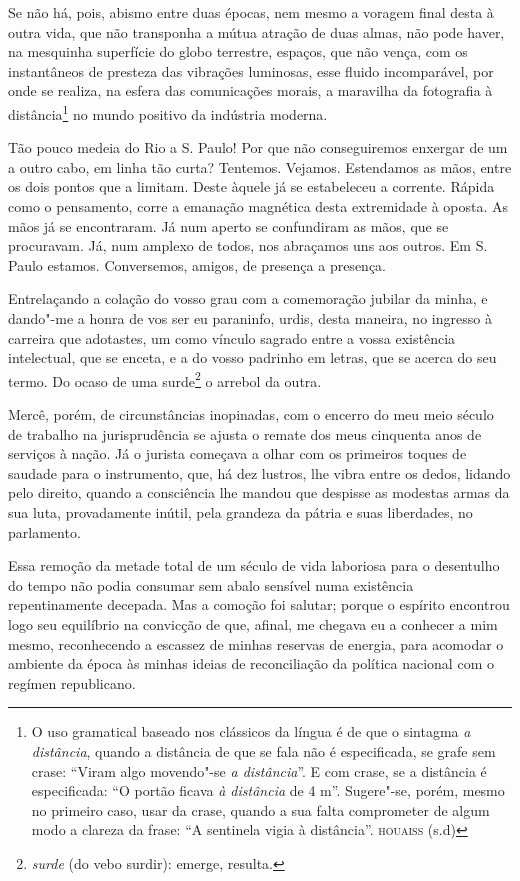 Se não há, pois, abismo entre duas épocas, nem mesmo a voragem
final desta à outra vida, que não transponha a mútua atração de duas
almas, não pode haver, na mesquinha superfície do globo terrestre,
espaços, que não vença, com os instantâneos de presteza das vibrações
luminosas, esse fluido incomparável, por onde se realiza, na esfera das
comunicações morais, a maravilha da fotografia à distância\footnote{ O
uso gramatical baseado nos clássicos da língua é de que o sintagma \textit{a
distância}, quando a distância de que se fala não é especificada, se
grafe sem crase: ``Viram algo movendo"-se \textit{a distância}''. E com crase, se a
distância é especificada: ``O portão ficava \textit{à distância} de 4 m''. 
Sugere"-se, porém, mesmo no primeiro caso, usar da crase, quando a sua
falta comprometer de algum modo a clareza da frase: ``A
sentinela vigia à distância''. \textsc{houaiss} (s.d)} no mundo
positivo da indústria moderna.

Tão pouco medeia do Rio a S. Paulo! Por que não conseguiremos
enxergar de um a outro cabo, em linha tão curta? Tentemos. Vejamos.
Estendamos as mãos, entre os dois pontos que a limitam. Deste àquele já
se estabeleceu a corrente. Rápida como o pensamento, corre a emanação
magnética desta extremidade à oposta. As mãos já se encontraram. Já num
aperto se confundiram as mãos, que se procuravam. Já, num amplexo de
todos, nos abraçamos uns aos outros. Em S. Paulo estamos. Conversemos,
amigos, de presença a presença.

Entrelaçando a colação do vosso grau com a comemoração jubilar da
minha, e dando"-me a honra de vos ser eu paraninfo, urdis, desta
maneira, no ingresso à carreira que adotastes, um como vínculo sagrado
entre a vossa existência intelectual, que se enceta, e a do vosso
padrinho em letras, que se acerca do seu termo. Do ocaso
de uma surde\footnote{ \textit{surde} (do vebo surdir): emerge,
resulta.} o arrebol da outra.

Mercê, porém, de circunstâncias inopinadas, com o encerro do meu
meio século de trabalho na jurisprudência se ajusta o remate dos meus
cinquenta anos de serviços à nação. Já o jurista começava a olhar com
os primeiros toques de saudade para o instrumento, que, há dez lustros,
lhe vibra entre os dedos, lidando pelo direito, quando a consciência
lhe mandou que despisse as modestas armas da sua luta, provadamente
inútil, pela grandeza da pátria e suas liberdades, no parlamento.

Essa remoção da metade total de um século de vida laboriosa para o
desentulho do tempo não podia consumar sem abalo sensível numa
existência repentinamente decepada. Mas a comoção foi salutar; porque o
espírito encontrou logo seu equilíbrio na convicção de que, afinal, me
chegava eu a conhecer a mim mesmo, reconhecendo a escassez de minhas
reservas de energia, para acomodar o ambiente da época às minhas ideias
de reconciliação da política nacional com o regímen republicano.


